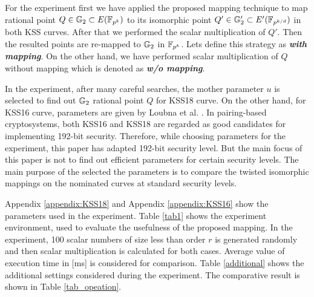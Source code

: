 For the experiment first we have applied the proposed mapping technique to map rational point $Q \in {\mathbb{G}}_{2} \subset E({\mathbb{F}}_{p^{k}})$ to its isomorphic point $Q' \in {\mathbb{G}}_{2}' \subset E'(\mathbb{F}_{p^{k/d}})$ in both KSS curves. After that we performed the scalar multiplication of $Q'$. Then the resulted points are re-mapped to ${\mathbb{G}}_{2}$ in $\mathbb{F}_{p^k}$. Lets define this strategy as \textit{\textbf{with mapping}}.
On the other hand, we have performed scalar multiplication of $Q$ without mapping which is denoted as \textit{\textbf{w/o mapping}}.

In the experiment, after many careful searches, the mother parameter $u$ is selected to find out ${\mathbb{G}}_{2}$ rational point $Q$ for KSS18 curve. On the other hand, for KSS16 curve, parameters are given by Loubna et al. \cite{EPRINT:GhaFou16b}.
In pairing-based cryptosystems, both KSS16 and KSS18 are regarded as good candidates for implementing 192-bit security.
Therefore, while choosing parameters for the experiment, this paper has adapted 192-bit security level. 
But the main focus of this paper is not to find out efficient parameters for certain security levels. 
The main purpose of the selected the parameters is to compare the twisted isomorphic mappings on the nominated curves at standard security levels. 

Appendix \ref{appendix:KSS18} and Appendix \ref{appendix:KSS16} show the parameters used in the experiment. Table \ref{tab1} shows the experiment environment, used to evaluate the usefulness of the proposed mapping.  
In the experiment, 100 scalar numbers of size less than order $r$ is generated randomly and then scalar multiplication is calculated for both cases. Average value of execution time in [ms] is considered for comparison. Table \ref{additional} shows the additional  settings considered during the experiment. The comparative result is shown in Table \ref{tab_opeation}.

\renewcommand{\baselinestretch}{1.5}
\begin{table*}
\centering
\caption{ Computational Environment}
\label{tab1}
\end{table*}
\renewcommand{\baselinestretch}{1.0}

